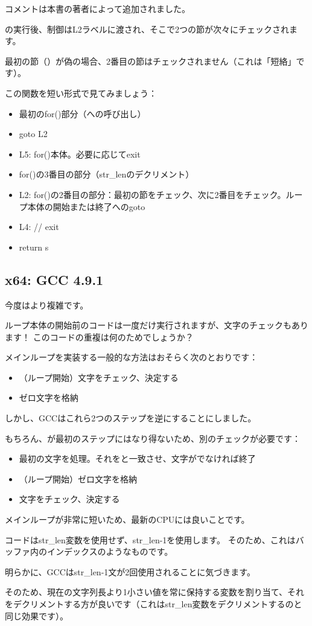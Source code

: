 コメントは本書の著者によって追加されました。

\strlen{}の実行後、制御はL2ラベルに渡され、そこで2つの節が次々にチェックされます。

最初の節（）が偽の場合、2番目の節はチェックされません（これは「短絡」です）。

この関数を短い形式で見てみましょう：

\begin{itemize}
\item 最初のfor()部分（\strlen{}への呼び出し）
\item goto L2
\item L5: for()本体。必要に応じてexit
\item for()の3番目の部分（str\_lenのデクリメント）
\item L2: 
for()の2番目の部分：最初の節をチェック、次に2番目をチェック。ループ本体の開始または終了へのgoto
\item L4: // exit
\item return s
\end{itemize}

\subsection{x64: \Optimizing GCC 4.9.1}
\label{string_trim_GCC_x64_O3}



今度はより複雑です。

ループ本体の開始前のコードは一度だけ実行されますが、\CRLF{}文字のチェックもあります！
このコードの重複は何のためでしょうか？

メインループを実装する一般的な方法はおそらく次のとおりです：

\begin{itemize}
\item （ループ開始）\CRLF{}文字をチェック、決定する
\item ゼロ文字を格納
\end{itemize}

しかし、GCCはこれら2つのステップを逆にすることにしました。

もちろん、が最初のステップにはなり得ないため、別のチェックが必要です：

\begin{itemize}
\item 最初の文字を処理。それを\CRLF{}と一致させ、文字が\CRLF{}でなければ終了

\item （ループ開始）ゼロ文字を格納

\item \CRLF{}文字をチェック、決定する
\end{itemize}

メインループが非常に短いため、最新の\ac{CPU}には良いことです。

コードはstr\_len変数を使用せず、str\_len-1を使用します。
そのため、これはバッファ内のインデックスのようなものです。

明らかに、GCCはstr\_len-1文が2回使用されることに気づきます。

そのため、現在の文字列長より1小さい値を常に保持する変数を割り当て、それをデクリメントする方が良いです（これはstr\_len変数をデクリメントするのと同じ効果です）。